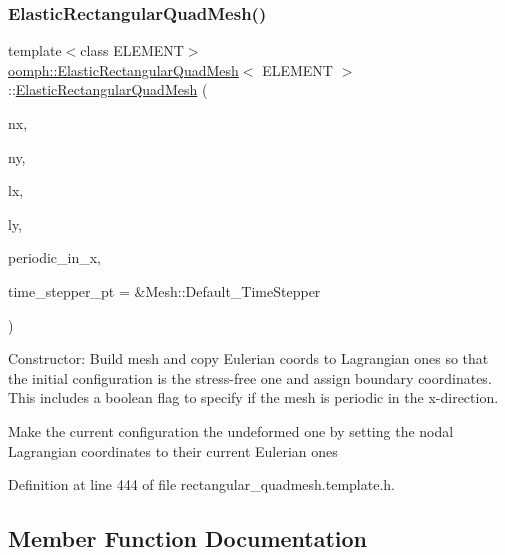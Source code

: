 \subsubsection{\texorpdfstring{Elastic\+Rectangular\+Quad\+Mesh()}{ElasticRectangularQuadMesh()}\hspace{0.1cm}{\footnotesize\ttfamily [3/3]}}
{\footnotesize\ttfamily template$<$class E\+L\+E\+M\+E\+NT$>$ \\
\hyperlink{classoomph_1_1ElasticRectangularQuadMesh}{oomph\+::\+Elastic\+Rectangular\+Quad\+Mesh}$<$ E\+L\+E\+M\+E\+NT $>$\+::\hyperlink{classoomph_1_1ElasticRectangularQuadMesh}{Elastic\+Rectangular\+Quad\+Mesh} (\begin{DoxyParamCaption}\item[{const unsigned \&}]{nx,  }\item[{const unsigned \&}]{ny,  }\item[{const double \&}]{lx,  }\item[{const double \&}]{ly,  }\item[{const bool \&}]{periodic\+\_\+in\+\_\+x,  }\item[{Time\+Stepper $\ast$}]{time\+\_\+stepper\+\_\+pt = {\ttfamily \&Mesh\+:\+:Default\+\_\+TimeStepper} }\end{DoxyParamCaption})\hspace{0.3cm}{\ttfamily [inline]}}



Constructor\+: Build mesh and copy Eulerian coords to Lagrangian ones so that the initial configuration is the stress-\/free one and assign boundary coordinates. This includes a boolean flag to specify if the mesh is periodic in the x-\/direction. 

Make the current configuration the undeformed one by setting the nodal Lagrangian coordinates to their current Eulerian ones 

Definition at line 444 of file rectangular\+\_\+quadmesh.\+template.\+h.



\subsection{Member Function Documentation}
\mbox{\label{classoomph_1_1ElasticRectangularQuadMesh_a84db22a37c49bf3958e149d67997bead}} 
